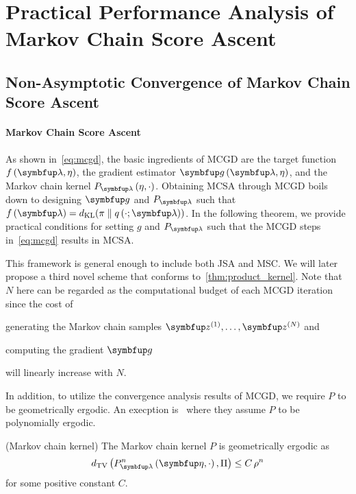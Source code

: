 
\section{Practical Performance Analysis of Markov Chain Score Ascent}
\subsection{Non-Asymptotic Convergence of Markov Chain Score Ascent}\label{section:convergence}

\vspace{-0.05in}
\paragraph{Markov Chain Score Ascent}
As shown in~\cref{eq:mcgd}, the basic ingredients of MCGD are the target function \(f\left(\vlambda, \eta\right)\), the gradient estimator \(\vg\left(\vlambda, \eta\right)\), and the Markov chain kernel \(P_{\vlambda}\left(\eta, \cdot\right)\).
Obtaining MCSA through MCGD boils down to designing \(\vg\) and \(P_{\vlambda}\) such that \(f\left(\vlambda\right) = \DKL{\pi}{q\left(\cdot; \vlambda\right)} \).
In the following theorem, we provide practical conditions for setting \(g\) and \(P_{\vlambda}\) such that the MCGD steps in~\cref{eq:mcgd} results in MCSA.



This framework is general enough to include both JSA and MSC.
We will later propose a third novel scheme that conforms to~\cref{thm:product_kernel}.
Note that \(N\) here can be regarded as the computational budget of each MCGD iteration since the cost of
\begin{enumerate*}[label=\textbf{(\roman*)}]
  \item generating the Markov chain samples \(\vz^{(1)}, \ldots, \vz^{(N)}\) and
  \item computing the gradient \(\vg\)
\end{enumerate*}
will linearly increase with \(N\).

In addition, to utilize the convergence analysis results of MCGD, we require \(P\) to be geometrically ergodic.
An execption is~\citet{debavelaere_convergence_2021} where they assume \(P\) to be polynomially ergodic.
\begin{assumption}{(Markov chain kernel)}\label{thm:kernel_conditions}
\vspace{-0.05in}
  The Markov chain kernel \(P\) is geometrically ergodic as
  {%
  \[
  \DTV{P_{\vlambda}^{n}\left(\veta, \cdot\right)}{ \Pi } \leq C \, \rho^{n}
  \]
  }
  for some positive constant \(C\).
\vspace{-0.05in}
\end{assumption}
\vspace{-0.05in}

